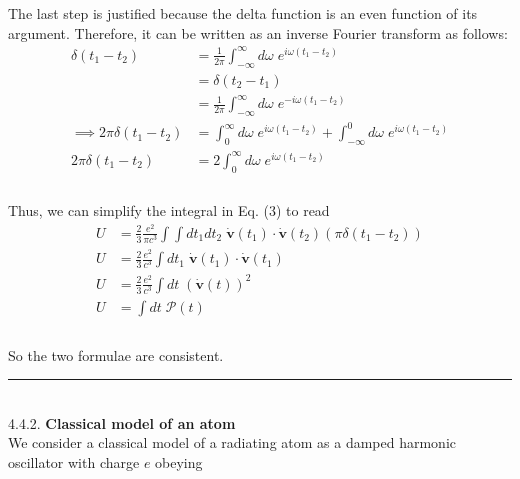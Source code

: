 \documentclass[]{article}
\begin{document}
The last step is justified because the delta function is an even function of its argument. Therefore, it can be written as an inverse Fourier transform as follows: \\

\begin{equation}
\begin{aligned}
\delta(t_1 - t_2) & = \frac{1}{2\pi} \int_{-\infty}^{\infty} d\omega \; e^{i\omega(t_1 - t_2)}  \\
& = \delta(t_2 - t_1) \\
& =  \frac{1}{2\pi} \int_{-\infty}^{\infty} d\omega \; e^{- i\omega(t_1 - t_2)} \\
\implies 2\pi \delta(t_1 - t_2)  & =  \int_{0}^{\infty} d\omega \; e^{i\omega(t_1 - t_2)} +  \int_{-\infty}^{0} d\omega \; e^{ i\omega(t_1 - t_2)} \\
2\pi \delta(t_1 - t_2)  & = 2 \int_{0}^{\infty} d\omega \; e^{i\omega(t_1 - t_2)} \\
\end{aligned}
\end{equation} \\

Thus, we can simplify the integral in Eq. (3) to read \\

\begin{equation}
\begin{aligned}
U & = \frac{2}{3} \frac{e^2}{\pi c^3}  \int \int dt_1 dt_2 \;  \dot{\bm{v}}(t_1) \cdot \dot{\bm{v}}(t_2) \left( \pi \delta(t_1 - t_2) \right)  \\
U & = \frac{2}{3} \frac{e^2}{ c^3} \int dt_1  \;  \dot{\bm{v}}(t_1) \cdot \dot{\bm{v}}(t_1)  \\
U & = \frac{2}{3} \frac{e^2}{ c^3} \int dt  \;  (\dot{\bm{v}}(t))^2  \\
U & =  \int dt  \;  \mathscr{P}(t) \\
\end{aligned}
\end{equation} \\

So the two formulae are consistent. \\

\hfill
\noindent\rule{15cm}{0.4pt} \\



4.4.2. {\bf Classical model of an atom} \\

We consider a classical model of a radiating atom as a damped harmonic oscillator with charge $e$ obeying
\end{document}

